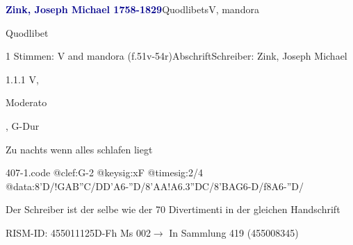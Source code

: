 \documentclass[twocolumn, 12pt]{book}
\begin{document}
\par \vspace{16pt} \textcolor{darkblue}{\textbf{Zink, Joseph Michael  1758-1829}}\hfillplus{\textbf{[407]}}\newline Quodlibets\newline V, mandora
\par \begin{itshape}[heading, f.51v:] Quodlibet\end{itshape} 
\par \textcolor{darkblue}{}  1 Stimmen: V and mandora  (f.51v-54r)\newline Abschrift\newline Schreiber: Zink, Joseph Michael
\par 1.1.1  V, \begin{itshape}Moderato\end{itshape}, G-Dur\newline \begin{footnotesize} Zu nachts wenn alles schlafen liegt \end{footnotesize}  
\begin{filecontents*}{407-1.code}
@clef:G-2
@keysig:xF
@timesig:2/4
@data:8'D/!GAB''C/DD'A6-''D/8'AA!{A6.3''DC}/8'BAG6-D/f8A6-''D/
\end{filecontents*}
\newline %
\par Der Schreiber ist der selbe wie der 70 Divertimenti in der gleichen Handschrift
\par RISM-ID: 455011125\newline D-Fh  Ms 002\newline $\rightarrow$ In Sammlung 419 (455008345)
      
\end{document}
